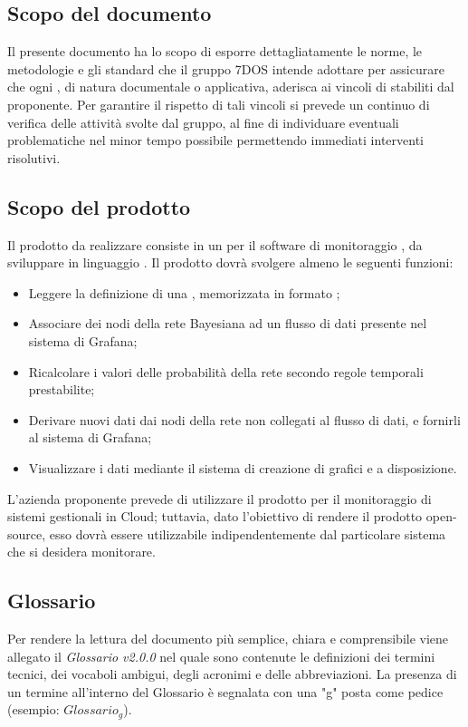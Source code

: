 \subsection{Scopo del documento}
Il presente documento ha lo scopo di esporre dettagliatamente le norme, le metodologie e gli standard che il gruppo 7DOS intende adottare per assicurare che ogni , di natura documentale o applicativa, aderisca ai vincoli di  stabiliti dal proponente. Per garantire il rispetto di tali vincoli si prevede un continuo  di verifica delle attività svolte dal gruppo, al fine di individuare eventuali problematiche nel minor tempo possibile permettendo immediati interventi risolutivi.
\subsection{Scopo del prodotto}
Il prodotto da realizzare consiste in un  per il software di monitoraggio , da sviluppare in linguaggio . Il prodotto dovrà svolgere almeno le seguenti funzioni:
\begin{itemize}
	\item{Leggere la definizione di una , memorizzata in formato ;}
	\item{Associare dei nodi della rete Bayesiana ad un flusso di dati presente nel sistema di Grafana;}
	\item{Ricalcolare i valori delle probabilità della rete secondo regole temporali prestabilite;}
	\item{Derivare nuovi dati dai nodi della rete non collegati al flusso di dati, e fornirli al sistema di Grafana;}
	\item{Visualizzare i dati mediante il sistema di creazione di grafici e  a disposizione.}
\end{itemize}
L'azienda proponente prevede di utilizzare il prodotto per il monitoraggio di sistemi gestionali in Cloud; tuttavia, dato l'obiettivo di rendere il prodotto open-source, esso dovrà essere utilizzabile indipendentemente dal particolare sistema che si desidera monitorare.
\subsection{Glossario}
Per rendere la lettura del documento più semplice, chiara e comprensibile viene allegato il \emph{Glossario v2.0.0} nel quale sono contenute le definizioni dei termini tecnici, dei vocaboli ambigui, degli acronimi e delle abbreviazioni. La presenza di un termine all'interno del Glossario è segnalata con una "g" posta come pedice (esempio: $Glossario_{g}$).
